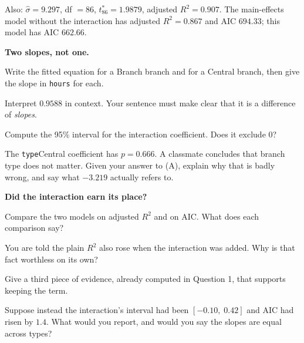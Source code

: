 \documentclass[11pt]{article}
\newcommand{\answerspace}[1]{\vspace{#1}}
\begin{document}
\noindent Also: $\hat\sigma = 9.297$, df $= 86$, $t^{\ast}_{86} = 1.9879$, adjusted
$R^2 = 0.907$. The main-effects model without the interaction has adjusted $R^2 = 0.867$ and
AIC $694.33$; this model has AIC $662.66$.

\begin{questions}

\item \textbf{Two slopes, not one.}

\begin{parts}
\item Write the fitted equation for a Branch branch and for a Central branch, then give the slope
in \texttt{hours} for each.
\answerspace{4.5em}

\item Interpret $0.9588$ in context. Your sentence must make clear that it is a difference of
\emph{slopes}.
\answerspace{4em}

\item Compute the 95\% interval for the interaction coefficient. Does it exclude $0$?
\answerspace{3.5em}

\item The \texttt{type}Central coefficient has $p = 0.666$. A classmate concludes that branch type
does not matter. Given your answer to (A), explain why that is badly wrong, and say what
$-3.219$ actually refers to.
\answerspace{4.5em}
\end{parts}

\item \textbf{Did the interaction earn its place?}

\begin{parts}
\item Compare the two models on adjusted $R^2$ and on AIC. What does each comparison say?
\answerspace{4em}

\item You are told the plain $R^2$ also rose when the interaction was added. Why is that fact
worthless on its own?
\answerspace{3.5em}

\item Give a third piece of evidence, already computed in Question 1, that supports keeping the term.
\answerspace{3em}

\item Suppose instead the interaction's interval had been $[-0.10,\; 0.42]$ and AIC had risen by
$1.4$. What would you report, and would you say the slopes are equal across types?
\answerspace{4em}
\end{parts}


\end{questions}
\end{document}
